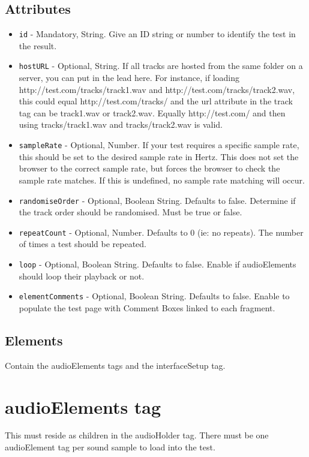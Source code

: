 \documentclass{article}
\begin{document}
\subsection{Attributes}
\begin{itemize}
\item \texttt{id} - Mandatory, String. Give an ID string or number to identify the test in the result.
\item \texttt{hostURL} - Optional, String. If all tracks are hosted from the same folder on a server, you can put in the lead here. For instance, if loading http://test.com/tracks/track1.wav and http://test.com/tracks/track2.wav, this could equal http://test.com/tracks/ and the url attribute in the track tag can be track1.wav or track2.wav. Equally http://test.com/ and then using tracks/track1.wav and tracks/track2.wav is valid.
\item \texttt{sampleRate} - Optional, Number. If your test requires a specific sample rate, this should be set to the desired sample rate in Hertz. This does not set the browser to the correct sample rate, but forces the browser to check the sample rate matches. If this is undefined, no sample rate matching will occur.
\item \texttt{randomiseOrder} - Optional, Boolean String. Defaults to false. Determine if the track order should be randomised. Must be true or false.
\item \texttt{repeatCount} - Optional, Number. Defaults to 0 (ie: no repeats). The number of times a test should be repeated.
\item \texttt{loop} - Optional, Boolean String. Defaults to false. Enable if audioElements should loop their playback or not.
\item \texttt{elementComments} - Optional, Boolean String. Defaults to false. Enable to populate the test page with Comment Boxes linked to each fragment.
\end{itemize}

\subsection{Elements}
Contain the audioElements tags and the interfaceSetup tag.

\section{audioElements tag}

This must reside as children in the audioHolder tag. There must be one audioElement tag per sound sample to load into the test.
\end{document}
